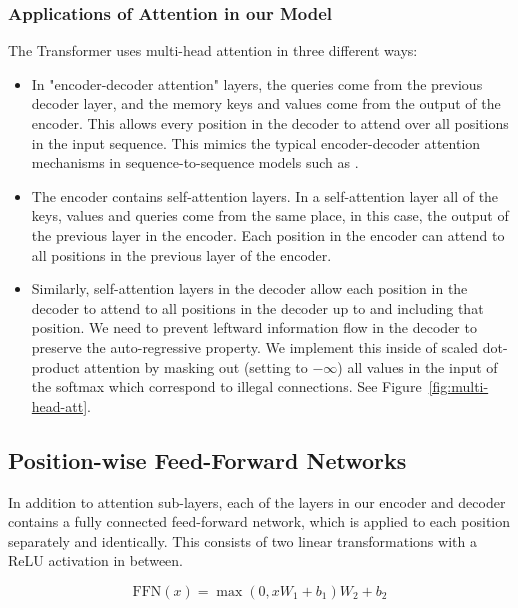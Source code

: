 \documentclass{article}
\begin{document}
\subsubsection{Applications of Attention in our Model}

The Transformer uses multi-head attention in three different ways: 
\begin{itemize}
 \item In "encoder-decoder attention" layers, the queries come from the previous decoder layer, and the memory keys and values come from the output of the encoder.   This allows every position in the decoder to attend over all positions in the input sequence.  This mimics the typical encoder-decoder attention mechanisms in sequence-to-sequence models such as \citep{wu2016google, bahdanau2014neural,JonasFaceNet2017}.

 \item The encoder contains self-attention layers.  In a self-attention layer all of the keys, values and queries come from the same place, in this case, the output of the previous layer in the encoder.   Each position in the encoder can attend to all positions in the previous layer of the encoder.

 \item Similarly, self-attention layers in the decoder allow each position in the decoder to attend to all positions in the decoder up to and including that position.  We need to prevent leftward information flow in the decoder to preserve the auto-regressive property.  We implement this inside of scaled dot-product attention by masking out (setting to $-\infty$) all values in the input of the softmax which correspond to illegal connections.  See Figure~\ref{fig:multi-head-att}.

\end{itemize}

\subsection{Position-wise Feed-Forward Networks}\label{sec:ffn}

In addition to attention sub-layers, each of the layers in our encoder and decoder contains a fully connected feed-forward network, which is applied to each position separately and identically.  This consists of two linear transformations with a ReLU activation in between.

\begin{equation}
   \mathrm{FFN}(x)=\max(0, xW_1 + b_1) W_2 + b_2
\end{equation}
\end{document}

